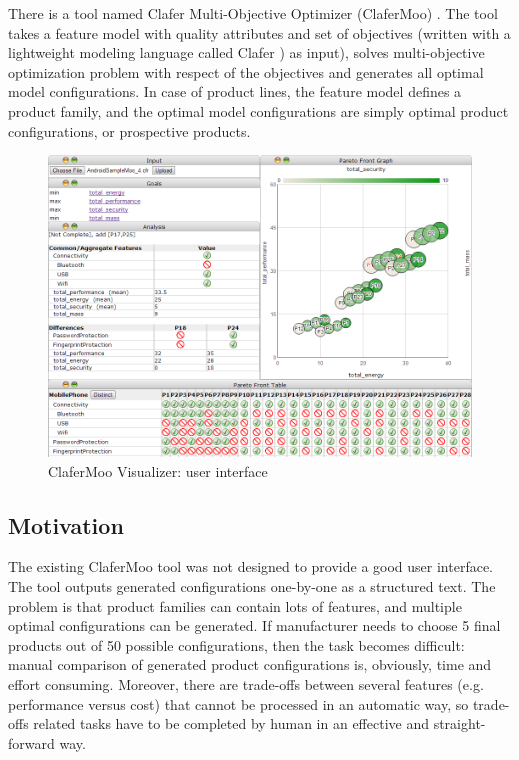 \documentclass{acm_proc_article-sp}
\begin{document}
There is a tool named Clafer Multi-Objective Optimizer (ClaferMoo) \cite{474}. The tool takes a feature model with quality attributes and set of objectives (written with a lightweight modeling language called Clafer \cite {bak:claferfeature}) as input), solves multi-objective optimization problem with respect of the objectives and generates all optimal model configurations. In case of product lines, the feature model defines a product family, and the optimal model configurations are simply optimal product configurations, or prospective products.

\begin{figure}[ht]
\includegraphics[width=\textwidth]{gui.png}
\caption{ClaferMoo Visualizer: user interface}    
  \label{fig:gui}
\end{figure}


\subsection{Motivation}

The existing ClaferMoo tool was not designed to provide a good user interface. The tool outputs generated configurations one-by-one as a structured text. The problem is that product families can contain lots of features, and multiple optimal  configurations can be generated. If manufacturer needs to choose 5 final products out of 50 possible configurations, then the task becomes difficult: manual comparison of generated product configurations is, obviously, time and effort consuming. Moreover, there are trade-offs between several features (e.g. performance versus cost) that cannot be processed in an automatic way, so trade-offs related tasks have to be completed by human in an effective and straight-forward way.
\end{document}
